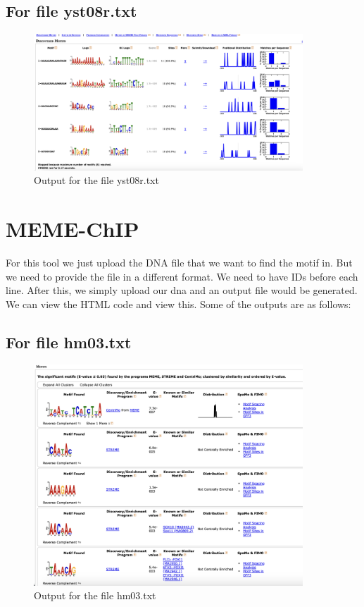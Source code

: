 \documentclass{report}
\begin{document}
\FloatBarrier
\subsection{For file yst08r.txt}

\begin{figure}[ht]
    \centering
    \includegraphics[width=0.9\textwidth]{STREME/STREME yst08r.png} 
    \caption{Output for the file yst08r.txt}
    \label{fig:ui2.4}
\end{figure}


\clearpage
\FloatBarrier
\section{MEME-ChIP}
For this tool we just upload the DNA file that we want to find the motif in. But we need to provide the file in a different format. We need to have IDs before each line. After this, we simply upload our dna and an output file would be generated. We can view the HTML code and view this. Some of the outputs are as follows:
\FloatBarrier
\subsection{For file hm03.txt}
\begin{figure}[ht]
    \centering
    \includegraphics[width=0.9\textwidth]{MEME_CHIP/MEME_CHIP hm03.png} 
    \caption{Output for the file hm03.txt}
    \label{fig:ui2.4}
\end{figure}
\end{document}
